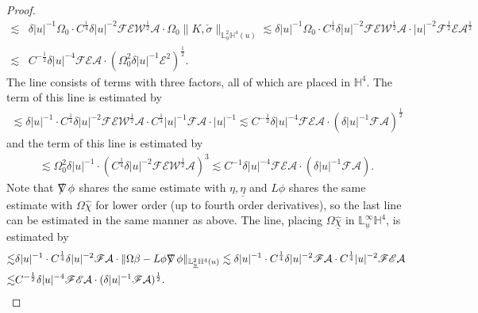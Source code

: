 \documentclass[11pt,reqno]{amsart}
\theoremstyle{definition}
\numberwithin{equation}{section}
\renewcommand{\L}{\mathbb{L}}
\renewcommand{\H}{\mathbb{H}}
\def\chibh{\widehat{\underline{\chi}}}
\def\chih{\widehat{\chi}}
\def\etab{\underline{\eta}}
\def\ub{\underline{u}}
\def\nablas{\mbox{$\nabla \mkern -13mu /$ }}
\begin{document}
\begin{proof}
\begin{align*}
\lesssim&\delta|u|^{-1}\Omega_0\cdot C^{\frac{1}{4}}\delta|u|^{-2}\mathscr{F}\mathscr{E}\mathscr{W}^{\frac{1}{2}}\mathcal{A}\cdot\Omega_0\|K,\check{\sigma}\|_{\L^2_{\ub}\H^4(u)}\lesssim\delta|u|^{-1}\Omega_0\cdot C^{\frac{1}{4}}\delta|u|^{-2}\mathscr{F}\mathscr{E}\mathscr{W}^{\frac{1}{2}}\mathcal{A}\cdot|u|^{-2}\mathscr{F}^{\frac{1}{2}}\mathscr{E}\mathcal{A}^{\frac{1}{2}}\\
\lesssim &C^{-\frac{1}{2}}\delta|u|^{-4}\mathscr{F}\mathscr{E}\mathcal{A}\cdot(\Omega_0^2\delta|u|^{-1}\mathscr{E}^2)^{\frac{1}{2}}.
\end{align*}
The  line consists of terms with three factors, all of which are placed in $\H^4$. The  term of this line is estimated by
\begin{align*}
\lesssim\delta|u|^{-1}\cdot C^{\frac{1}{4}}\delta|u|^{-2}\mathscr{F}\mathscr{E}\mathscr{W}^{\frac{1}{2}}\mathcal{A}\cdot C^{\frac{1}{4}}|u|^{-1}\mathscr{F}\mathcal{A}\cdot|u|^{-1}\lesssim C^{-\frac{1}{2}} \delta|u|^{-4}\mathscr{F}\mathscr{E}\mathcal{A}\cdot(\delta|u|^{-1}\mathscr{F}\mathcal{A})^{\frac{1}{2}}
\end{align*}
and the  term of this line is estimated by
\begin{align*}
\lesssim\Omega_0^2\delta|u|^{-1}\cdot(C^{\frac{1}{4}}\delta|u|^{-2}\mathscr{F}\mathscr{E}\mathscr{W}^{\frac{1}{2}}\mathcal{A})^3\lesssim C^{-1}\delta|u|^{-4}\mathscr{F}\mathscr{E}\mathcal{A}\cdot(\delta|u|^{-1}\mathscr{F}\mathcal{A}).
\end{align*}
Note that $\nablas\phi$ shares the same estimate with $\eta,\etab$ and $L\phi$ shares the same estimate with $\Omega\chih$ for lower order (up to fourth order derivatives), so the last line can be estimated in the same manner as above. The  line, placing $\Omega\chibh$ in $\L^\infty_{\ub}\H^4$, is estimated by
\begin{align*}
\lesssim&\delta|u|^{-1}\cdot C^{\frac{1}{4}}\delta|u|^{-2}\mathscr{F}\mathcal{A}\cdot\|\Omega\beta-L\phi\nablas\phi\|_{\L^2_{\ub}\H^4(u)}\lesssim\delta|u|^{-1}\cdot C^{\frac{1}{4}}\delta|u|^{-2}\mathscr{F}\mathcal{A}\cdot C^{\frac{1}{4}}|u|^{-2}\mathscr{F}\mathscr{E}\mathcal{A}\\
\lesssim&C^{-\frac{1}{2}} \delta|u|^{-4}\mathscr{F}\mathscr{E}\mathcal{A}\cdot(\delta|u|^{-1}\mathscr{F}\mathcal{A})^{\frac{1}{2}}.\end{align*}


\end{proof}
\end{document}
